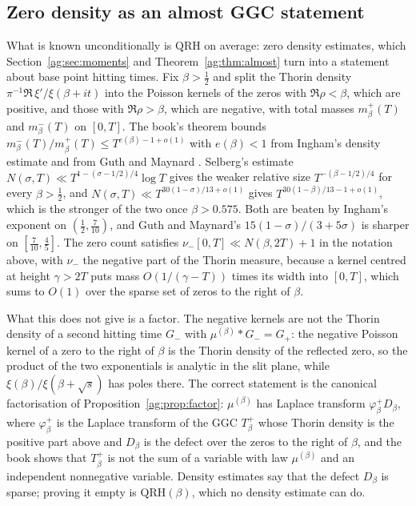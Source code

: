 \subsection{Zero density as an almost GGC statement}
What is known unconditionally is $\mathrm{QRH}$ on average: zero density estimates, which Section~\ref{ag:sec:moments} and Theorem~\ref{ag:thm:almost} turn into a statement about base point hitting times. Fix $\beta>\frac12$ and split the Thorin density $\pi^{-1}\Re\,\xi'/\xi(\beta+it)$ into the Poisson kernels of the zeros with $\Re\rho<\beta$, which are positive, and those with $\Re\rho>\beta$, which are negative, with total masses $m^+_\beta(T)$ and $m^-_\beta(T)$ on $[0,T]$. The book's theorem bounds $m^-_\beta(T)/m^+_\beta(T)\le T^{e(\beta)-1+o(1)}$ with $e(\beta)<1$ from Ingham's density estimate \cite{Ingham40} and from Guth and Maynard \cite[Theorem 1.2]{GM26}. Selberg's estimate $N(\sigma,T)\ll T^{1-(\sigma-1/2)/4}\log T$ \cite{Selberg46} gives the weaker relative size $T^{-(\beta-1/2)/4}$ for every $\beta>\frac12$, and $N(\sigma,T)\ll T^{30(1-\sigma)/13+o(1)}$ gives $T^{30(1-\beta)/13-1+o(1)}$, which is the stronger of the two once $\beta>0.575$. Both are beaten by Ingham's exponent on $(\frac12,\frac7{10})$, and Guth and Maynard's $15(1-\sigma)/(3+5\sigma)$ is sharper on $[\frac7{10},\frac45]$. %
The zero count satisfies $\nu_-[0,T]\ll N(\beta,2T)+1$ in the notation above, with $\nu_-$ the negative part of the Thorin measure, because a kernel centred at height $\gamma>2T$ puts mass $O(1/(\gamma-T))$ times its width into $[0,T]$, which sums to $O(1)$ over the sparse set of zeros to the right of $\beta$.

What this does not give is a factor. The negative kernels are not the Thorin density of a second hitting time $G_-$ with $\mu^{(\beta)}*G_-=G_+$: the negative Poisson kernel of a zero to the right of $\beta$ is the Thorin density of the reflected zero, so the product of the two exponentials is analytic in the slit plane, while $\xi(\beta)/\xi(\beta+\sqrt s)$ has poles there. The correct statement is the canonical factorisation of Proposition~\ref{ag:prop:factor}: $\mu^{(\beta)}$ has Laplace transform $\varphi^+_\beta D_\beta$, where $\varphi^+_\beta$ is the Laplace transform of the GGC $T^+_\beta$ whose Thorin density is the positive part above and $D_\beta$ is the defect over the zeros to the right of $\beta$, and the book shows that $T^+_\beta$ is not the sum of a variable with law $\mu^{(\beta)}$ and an independent nonnegative variable. Density estimates say that the defect $D_\beta$ is sparse; proving it empty is $\mathrm{QRH}(\beta)$, which no density estimate can do.

